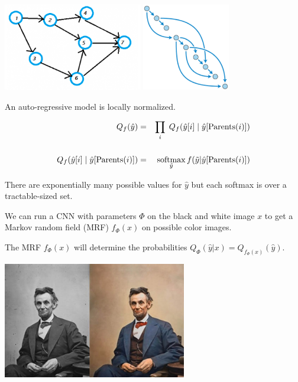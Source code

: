 {\centerline{\includegraphics[height=1.5in]{../images/DAG} \hspace{1in} \includegraphics[height=1.5in]{../images/SortedDAG}}

\vfill
An auto-regressive model is locally normalized.

\begin{eqnarray*}
  Q_f(\hat{y}) & = & \prod_i \; Q_f(\hat{y}[i]\;|\; \hat{y}[\mathrm{Parents}(i)]) \\
  \\
  Q_f(\hat{y}[i]\;|\; \hat{y}[\mathrm{Parents}(i)])  & = &  \operatorname*{softmax}_{\tilde{y}} f(\tilde{y}|\hat{y}[\mathrm{Parents}(i)])
\end{eqnarray*}

\vfill
There are exponentially many possible values for $\hat{y}$ but each softmax is over a tractable-sized set.


We can run a CNN with parameters $\Phi$ on the black and white image $x$ to get a Markov random field (MRF) $f_\Phi(x)$ on possible color images.

\vfill
The MRF $f_\Phi(x)$ will determine the probabilities $Q_\Phi(\hat{y}|x) = Q_{f_\Phi(x)}(\hat{y})$.


\centerline{\includegraphics[height = 2in]{../images/colorization}}

}
